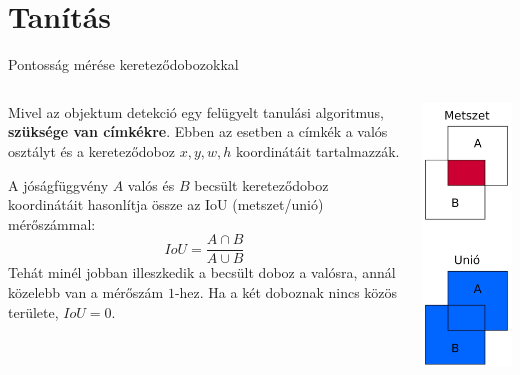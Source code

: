 \documentclass[english, aspectratio=169]{beamer}
\makeatletter
\let\origtableofcontents=\tableofcontents
\def\tableofcontents{\@ifnextchar[{\origtableofcontents}{\gobbletableofcontents}}
\def\gobbletableofcontents#1{\origtableofcontents}
\makeatother
\begin{document}
\section{Tanítás}

\begin{frame}
\tableofcontents[currentsection]
\end{frame}

\begin{frame}{Pontosság mérése kereteződobozokkal}
\begin{columns}
\begin{column}{.7\textwidth}
Mivel az objektum detekció egy felügyelt tanulási algoritmus, \textbf{szüksége van címkékre}. Ebben az esetben a címkék a valós osztályt és a kereteződoboz $x,y,w,h$ koordinátáit tartalmazzák.\par\smallskip
A jóságfüggvény $A$ valós és $B$ becsült kereteződoboz koordinátáit hasonlítja össze az IoU (metszet/unió) mérőszámmal:
\[
IoU=\frac{A \cap B}{A \cup B}
\]
Tehát minél jobban illeszkedik a becsült doboz a valósra, annál közelebb van a mérőszám $1$-hez. Ha a két doboznak nincs közös területe, $IoU=0$.
\end{column}
\begin{column}{.3\textwidth}
\begin{center}
\includegraphics[height=7cm, width=7cm, keepaspectratio]{images/od_9.png}
\end{center}
\end{column}
\end{columns}
\end{frame}
\end{document}

